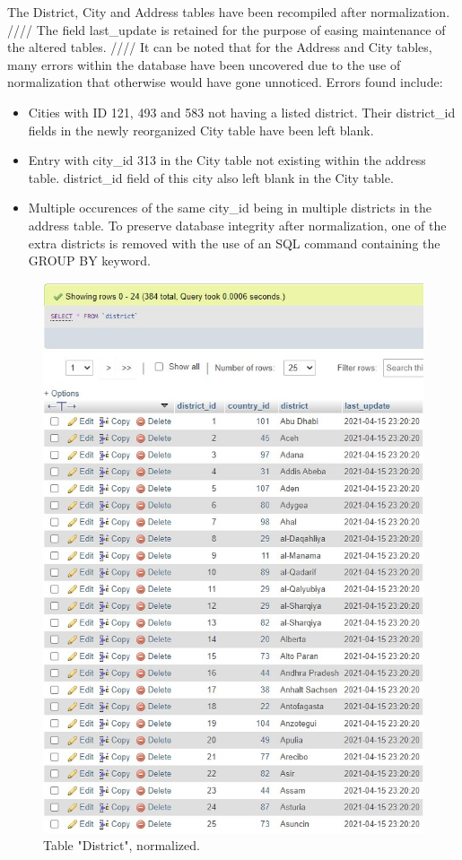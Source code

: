 \documentclass{article}
\begin{document}
		The District, City and Address tables have been recompiled after normalization. ////
		The field last_update is retained for the purpose of easing maintenance of the altered tables. ////
		It can be noted that for the Address and City tables, many errors within the database have been uncovered due to the use of normalization that otherwise would have gone unnoticed.  Errors found include: 
		\begin{itemize}
			\item Cities with ID 121, 493 and 583 not having a listed district. Their district_id fields in the newly reorganized City table have been left blank.
			\item Entry with city_id 313 in the City table not existing within the address table. district_id field of this city also left blank in the City table.
			\item Multiple occurences of the same city_id being in multiple districts in the address table. To preserve database integrity after normalization, one of the extra districts is removed with the use of an SQL command containing the GROUP BY keyword. 
		\end{itemize}
		\begin{figure}[H]
			\includegraphics[width=\textwidth]{table_district_norm}
			\caption{Table "District", normalized.}
		\end{figure}
\end{document}
